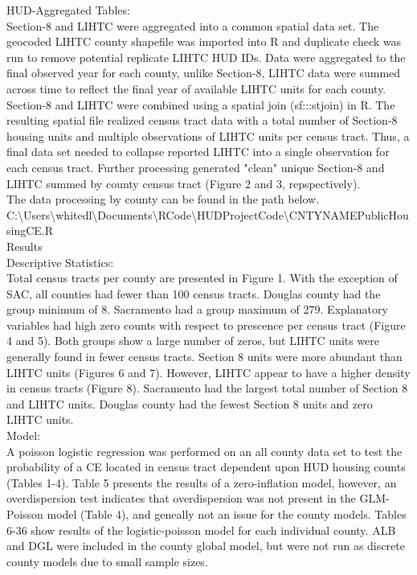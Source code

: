 \documentclass{article}\usepackage[]{graphicx}\usepackage[]{color}
\begin{document}
HUD-Aggregated Tables:\\
Section-8 and LIHTC were aggregated into a common spatial data set. The geocoded LIHTC county shapefile was imported into R and duplicate check was run to remove potential replicate LIHTC HUD IDs. Data were aggregated to the final observed year for each county, unlike Section-8, LIHTC data were summed across time to reflect the final year of available LIHTC units for each county. Section-8 and LIHTC were combined using a spatial join (sf:::st\textunderscore join) in R. The resulting spatial file realized census tract data with a total number of Section-8 housing units and multiple observations of LIHTC units per census tract. Thus, a final data set needed to collapse reported LIHTC into a single observation for each census tract. Further processing generated "clean" unique Section-8 and LIHTC summed by county census tract (Figure 2 and 3, repspectively). \\

The data processing by county can be found in the path below.\\ 
C:\textbackslash Users\textbackslash whitedl\textbackslash Documents\textbackslash R\textunderscore Code\textbackslash HUD\textunderscore Project\textunderscore Code\textbackslash CNTYNAME\textunderscore Public\textunderscore Housing\textunderscore CE.R\\


Results\\
Descriptive Statistics:\\
Total census tracts per county are presented in Figure 1. With the exception of SAC, all counties had fewer than 100 census tracts. Douglas county had the group minimum of 8. Sacramento had a group maximum of 279. Explanatory variables had high zero counts with respect to prescence per census tract (Figure 4 and 5). Both groups show a large number of zeros, but LIHTC units were generally found in fewer census tracts. Section 8 units were more abundant than LIHTC units (Figures 6 and 7). However, LIHTC appear to have a higher density in census tracts (Figure 8). Sacramento had the largest total number of Section 8 and LIHTC units. Douglas county had the fewest Section 8 units and zero LIHTC units.\\  


Model:\\
A poisson logistic regression was performed on an all county data set to test the probability of a CE located in census tract dependent upon HUD housing counts (Tables 1-4). Table 5 presents the results of a zero-inflation model, however, an overdispersion test indicates that overdispersion was not present in the GLM-Poisson model (Table 4), and geneally not an issue for the county models. Tables 6-36 show results of the logistic-poisson model for each individual county. ALB and DGL were included in the county global model, but were not run as discrete county models due to small sample sizes. \\
\end{document}
